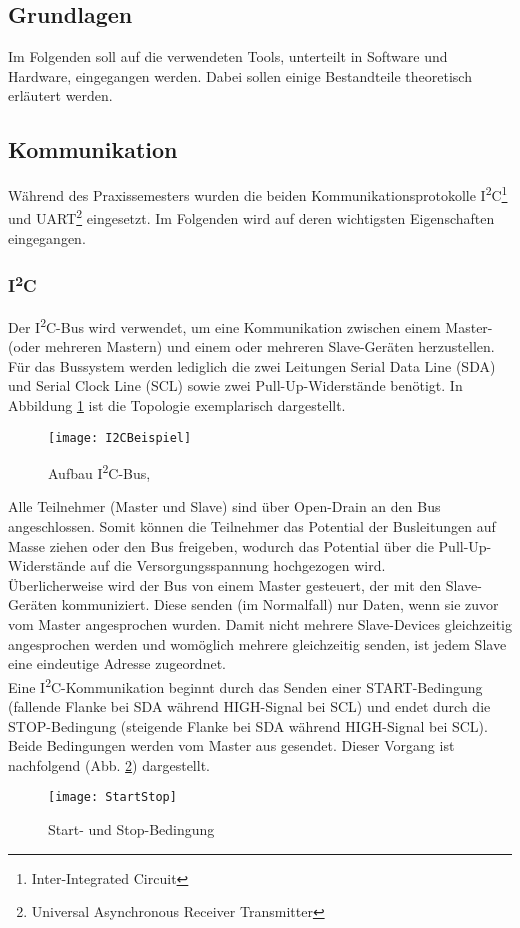 \documentclass[
	letterpaper, %
	10pt, %
]{CSUniSchoolLabReport}
\begin{document}
\begin{spacing}{1.6}
\newpage
\section{Grundlagen}
Im Folgenden soll auf die verwendeten Tools, unterteilt in Software und Hardware, eingegangen werden. Dabei sollen einige Bestandteile theoretisch erläutert werden.

\subsection{Kommunikation}
Während des Praxissemesters wurden die beiden Kommunikationsprotokolle I\textsuperscript{2}C\footnote{Inter-Integrated Circuit} und UART\footnote{Universal Asynchronous Receiver Transmitter} eingesetzt. Im Folgenden wird auf deren wichtigsten Eigenschaften eingegangen.
\subsubsection{I\textsuperscript{2}C}
Der I\textsuperscript{2}C-Bus wird verwendet, um eine Kommunikation zwischen einem Master- (oder mehreren Mastern) und einem oder mehreren Slave-Geräten herzustellen. Für das Bussystem werden lediglich die zwei Leitungen Serial Data Line (SDA) und Serial Clock Line (SCL) sowie zwei Pull-Up-Widerstände benötigt. In Abbildung \ref{fig:I2CBus} ist die Topologie exemplarisch dargestellt.
\begin{figure}[H]
    \centering
    \texttt{[image: I2CBeispiel]}
    \caption{Aufbau I\textsuperscript{2}C-Bus, \cite[1]{TI_I2C}}
    \label{fig:I2CBus}
\end{figure}
Alle Teilnehmer (Master und Slave) sind über Open-Drain an den Bus angeschlossen. Somit können die Teilnehmer das Potential der Busleitungen auf Masse ziehen oder den Bus freigeben, wodurch das Potential über die Pull-Up-Widerstände auf die Versorgungsspannung hochgezogen wird.\\
Überlicherweise wird der Bus von einem Master gesteuert, der mit den Slave-Geräten kommuniziert. Diese senden (im Normalfall) nur Daten, wenn sie zuvor vom Master angesprochen wurden. Damit nicht mehrere Slave-Devices gleichzeitig angesprochen werden und womöglich mehrere gleichzeitig senden, ist jedem Slave eine eindeutige Adresse zugeordnet.\\
Eine I\textsuperscript{2}C-Kommunikation beginnt durch das Senden einer START-Bedingung (fallende Flanke bei SDA während HIGH-Signal bei SCL) und endet durch die STOP-Bedingung (steigende Flanke bei SDA während HIGH-Signal bei SCL). Beide Bedingungen werden vom Master aus gesendet. Dieser Vorgang ist nachfolgend (Abb. \ref{fig:Start-Stop-Bedingung}) dargestellt.
\begin{figure}[H]
    \centering
    \texttt{[image: StartStop]}
    \caption{Start- und Stop-Bedingung \cite[4]{TI_I2C}}
    \label{fig:Start-Stop-Bedingung}
\end{figure}


\end{spacing}
\end{document}
